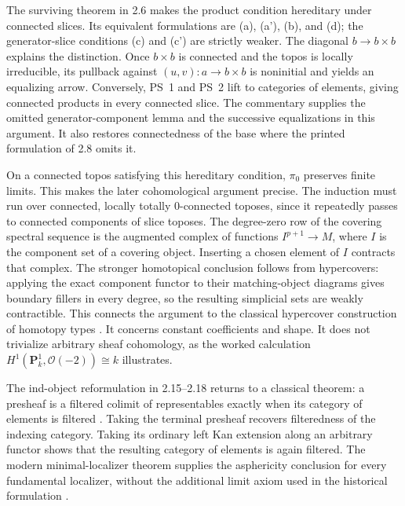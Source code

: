 The surviving theorem in 2.6 makes the product condition hereditary under connected slices. Its equivalent formulations are (a), (a'), (b), and (d); the generator-slice conditions (c) and (c') are strictly weaker. The diagonal $b\to b\times b$ explains the distinction. Once $b\times b$ is connected and the topos is locally irreducible, its pullback against $(u,v):a\to b\times b$ is noninitial and yields an equalizing arrow. Conversely, PS~1 and PS~2 lift to categories of elements, giving connected products in every connected slice. The commentary supplies the omitted generator-component lemma and the successive equalizations in this argument. It also restores connectedness of the base where the printed formulation of 2.8 omits it.

On a connected topos satisfying this hereditary condition, $\pi_0$ preserves finite limits. This makes the later cohomological argument precise. The induction must run over connected, locally totally $0$-connected toposes, since it repeatedly passes to connected components of slice toposes. The degree-zero row of the covering spectral sequence is the augmented complex of functions $I^{p+1}\to M$, where $I$ is the component set of a covering object. Inserting a chosen element of $I$ contracts that complex. The stronger homotopical conclusion follows from hypercovers: applying the exact component functor to their matching-object diagrams gives boundary fillers in every degree, so the resulting simplicial sets are weakly contractible. This connects the argument to the classical hypercover construction of homotopy types \citep[\S\S8--9]{ArtinMazur1969}. It concerns constant coefficients and shape. It does not trivialize arbitrary sheaf cohomology, as the worked calculation $H^1(\mathbf P^1_k,\mathcal O(-2))\cong k$ illustrates.

The ind-object reformulation in 2.15--2.18 returns to a classical theorem: a presheaf is a filtered colimit of representables exactly when its category of elements is filtered \citep[Expos\'e~I, Theorem~8.3.3]{SGA4I1972}. Taking the terminal presheaf recovers filteredness of the indexing category. Taking its ordinary left Kan extension along an arbitrary functor shows that the resulting category of elements is again filtered. The modern minimal-localizer theorem supplies the asphericity conclusion for every fundamental localizer, without the additional limit axiom used in the historical formulation \citep[Theorem~2.2.11]{Cisinski2004Minimal}.

